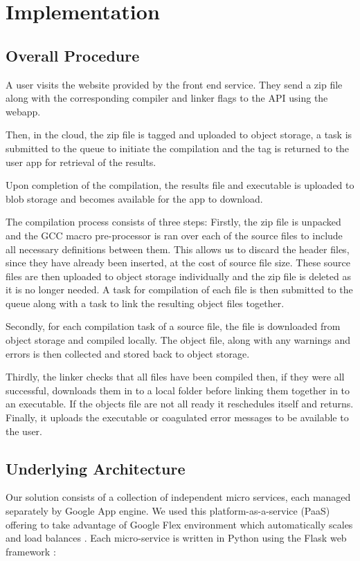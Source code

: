 \documentclass[conference]{IEEEtran}
\begin{document}

\section{Implementation}
\subsection{Overall Procedure}
A user visits the website provided by the front end service. They send a zip file along with the corresponding compiler and linker flags to the API using the webapp.

Then, in the cloud, the zip file is tagged and uploaded to object storage, a task is submitted to the queue to initiate the compilation and the tag is returned to the user app for retrieval of the results.

Upon completion of the compilation, the results file and executable is uploaded to blob storage and becomes available for the app to download.

The compilation process consists of three steps:
Firstly, the zip file is unpacked and the GCC macro pre-processor is ran over each of
the source files to include all necessary definitions between them. This allows us to discard the header files, since they have already been inserted, at the cost of source file size. These source files are then uploaded to object storage individually and the zip file is deleted as it is no longer needed. A task for compilation of each file is then submitted to the queue along with a task to link the resulting object files together. 

Secondly, for each compilation task of a source file, the file is downloaded from object storage and compiled locally. The object file, along with any warnings and errors is then collected and stored back to object storage.

Thirdly, the linker checks that all files have been compiled then, if they were
all successful, downloads them in to a local folder before linking them together
in to an executable. If the objects file are not all ready it reschedules
itself and returns. Finally, it uploads the executable or coagulated error messages to be available to the user.

\subsection{Underlying Architecture}
Our solution consists of a collection of independent micro services, each
managed separately by Google App engine. We used this platform-as-a-service (PaaS) offering to take advantage of Google Flex environment which automatically scales and load balances \cite{GAE}. Each micro-service is written in Python using the Flask web framework \cite{Flask}:
\end{document}

